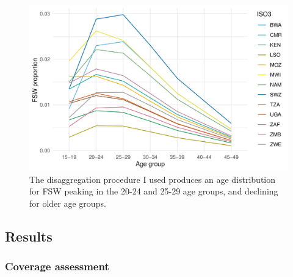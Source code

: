 \documentclass[a4paper, nobind]{templates/ociamthesis}
\begin{document}
\begin{figure}

{\centering \includegraphics[width=0.95\linewidth]{resources/multi-agyw/20230627-144735-3da88508/depends/age-disagg-fsw-line} 

}

\caption{The disaggregation procedure I used produces an age distribution for FSW peaking in the 20-24 and 25-29 age groups, and declining for older age groups.}\label{fig:age-disagg-fsw-line}
\end{figure}

\hypertarget{results}{%
\subsection{Results}\label{results}}

\hypertarget{coverage-assessment}{%
\subsubsection{Coverage assessment}\label{coverage-assessment}}
\end{document}
